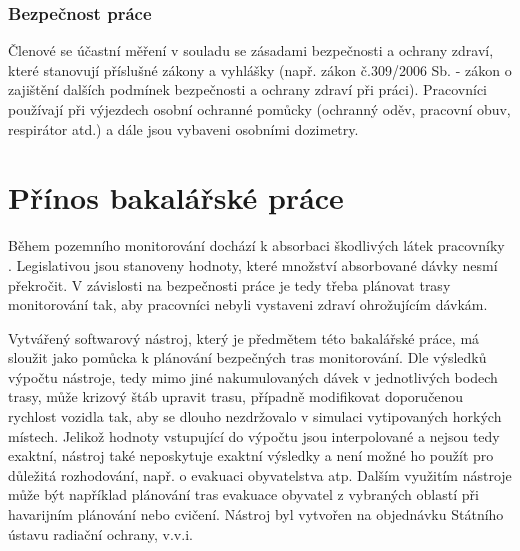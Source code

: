 \subsubsection{Bezpečnost práce}

Členové  se účastní měření v souladu se zásadami bezpečnosti a ochrany zdraví, které stanovují příslušné zákony a vyhlášky (např. zákon č.309/2006 Sb. - zákon o zajištění dalších podmínek bezpečnosti a ochrany zdraví při práci). Pracovníci používají při výjezdech osobní ochranné pomůcky (ochranný oděv, pracovní obuv, respirátor atd.) a dále jsou vybaveni osobními dozimetry. 

\section{Přínos bakalářské práce}
Během pozemního monitorování dochází k absorbaci škodlivých látek pracovníky . Legislativou jsou stanoveny hodnoty, které množství absorbované dávky nesmí překročit. V závislosti na bezpečnosti práce je tedy třeba plánovat trasy monitorování tak, aby pracovníci  nebyli vystaveni zdraví ohrožujícím dávkám. 

Vytvářený softwarový nástroj, který je předmětem této bakalářské práce, má sloužit jako pomůcka k plánování bezpečných tras monitorování. Dle výsledků výpočtu nástroje, tedy mimo jiné nakumulovaných dávek v jednotlivých bodech trasy, může krizový štáb upravit trasu, případně modifikovat doporučenou rychlost vozidla tak, aby se dlouho nezdržovalo v simulaci vytipovaných horkých místech. Jelikož hodnoty vstupující do výpočtu jsou interpolované a nejsou tedy exaktní, nástroj také neposkytuje exaktní výsledky a není možné ho použít pro důležitá rozhodování, např. o evakuaci obyvatelstva atp. Dalším využitím nástroje může být například plánování tras evakuace obyvatel z vybraných oblastí při havarijním plánování nebo cvičení. Nástroj byl vytvořen na objednávku Státního ústavu radiační ochrany, v.v.i.